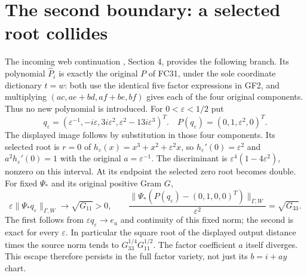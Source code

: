 \section{The second boundary: a selected root collides}
The incoming web continuation \cite{fullfable:WebFable}, Section 4, provides
the following branch. Its polynomial $\widehat P_i$ is exactly the
original $P$ of FC31, under the sole coordinate dictionary $t=w$:
both use the identical five factor expressions in GF2, and multiplying
$(ac,ae+bd,af+be,bf)$ gives each of the four original components.
Thus no new polynomial is introduced. For $0<\varepsilon<1/2$ put
\[
 q_\varepsilon=(\varepsilon^{-1},-i\varepsilon,
          3i\varepsilon^2,\varepsilon^2-13i\varepsilon^3)^T.
 \quad P(q_\varepsilon)=(0,1,\varepsilon^2,0)^T.
 \tag{RC1}
\]
The displayed image follows by substitution in those four components.
Its selected root is $r=0$ of $h_\varepsilon(x)=x^3+x^2+
\varepsilon^2x$, so $h_\varepsilon'(0)=\varepsilon^2$ and
$a^2h_\varepsilon'(0)=1$ with the original $a=\varepsilon^{-1}$.
The discriminant is $\varepsilon^4(1-4\varepsilon^2)$, nonzero
on this interval. At its endpoint the selected zero root becomes
double. For fixed $\Psi_*$ and its original positive Gram $G$,
\[
 \varepsilon\|\Psi_*q_\varepsilon\|_{\Gamma,W}
       \longrightarrow\sqrt{G_{11}}>0,\qquad
 \frac{\|\Psi_*(P(q_\varepsilon)-(0,1,0,0)^T)\|_{\Gamma,W}}
      {\varepsilon^2}=\sqrt{G_{33}}.
 \tag{RC2}
\]
The first follows from $\varepsilon q_\varepsilon\to e_a$ and
continuity of this fixed norm; the second is exact for every
$\varepsilon$. In particular the square root of the displayed
output distance times the source norm tends to
$G_{33}^{1/4}G_{11}^{1/2}$. The factor coefficient $a$ itself
diverges. This escape therefore persists in the full factor variety,
not just its $b=i+ay$ chart.

